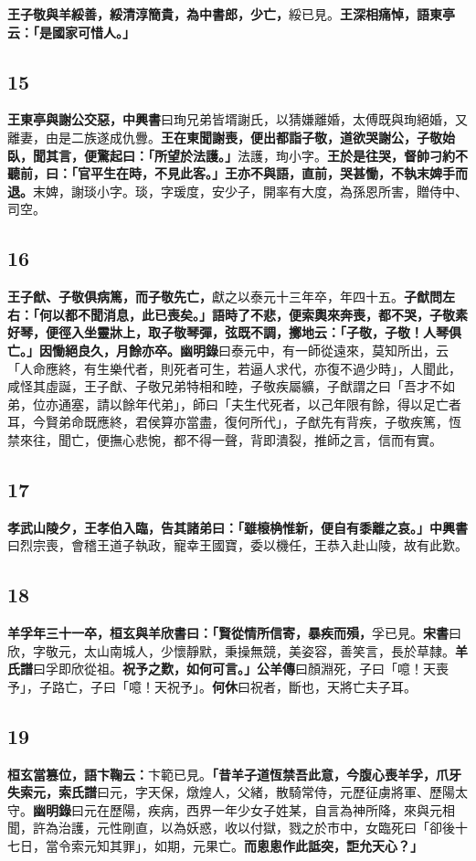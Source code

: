 \textbf{王子敬與羊綏善，綏清淳簡貴，為中書郎，少亡，}{\footnotesize 綏已見。}\textbf{王深相痛悼，語東亭云：「是國家可惜人。」}

\subsection*{15}

\textbf{王東亭與謝公交惡，}{\footnotesize \textbf{中興書}曰珣兄弟皆壻謝氏，以猜嫌離婚，太傅既與珣絕婚，又離妻，由是二族遂成仇釁。}\textbf{王在東聞謝喪，便出都詣子敬，道欲哭謝公，子敬始臥，聞其言，便驚起曰：「所望於法護。」}{\footnotesize 法護，珣小字。}\textbf{王於是往哭，督帥刁約不聽前，曰：「官平生在時，不見此客。」王亦不與語，直前，哭甚慟，不執末婢手而退。}{\footnotesize 末婢，謝琰小字。琰，字瑗度，安少子，開率有大度，為孫恩所害，贈侍中、司空。}

\subsection*{16}

\textbf{王子猷、子敬俱病篤，而子敬先亡，}{\footnotesize 獻之以泰元十三年卒，年四十五。}\textbf{子猷問左右：「何以都不聞消息，此已喪矣。」語時了不悲，便索輿來奔喪，都不哭，子敬素好琴，便徑入坐靈牀上，取子敬琴彈，弦既不調，擲地云：「子敬，子敬！人琴俱亡。」因慟絕良久，月餘亦卒。}{\footnotesize \textbf{幽明錄}曰泰元中，有一師從遠來，莫知所出，云「人命應終，有生樂代者，則死者可生，若逼人求代，亦復不過少時」，人聞此，咸怪其虛誕，王子猷、子敬兄弟特相和睦，子敬疾屬纊，子猷謂之曰「吾才不如弟，位亦通塞，請以餘年代弟」，師曰「夫生代死者，以己年限有餘，得以足亡者耳，今賢弟命既應終，君侯算亦當盡，復何所代」，子猷先有背疾，子敬疾篤，恆禁來往，聞亡，便撫心悲惋，都不得一聲，背即潰裂，推師之言，信而有實。}

\subsection*{17}

\textbf{孝武山陵夕，王孝伯入臨，告其諸弟曰：「雖榱桷惟新，便自有黍離之哀。」}{\footnotesize \textbf{中興書}曰烈宗喪，會稽王道子執政，寵幸王國寶，委以機任，王恭入赴山陵，故有此歎。}

\subsection*{18}

\textbf{羊孚年三十一卒，桓玄與羊欣書曰：「賢從情所信寄，暴疾而殞，}{\footnotesize 孚已見。\textbf{宋書}曰欣，字敬元，太山南城人，少懷靜默，秉操無競，美姿容，善笑言，長於草隸。\textbf{羊氏譜}曰孚即欣從祖。}\textbf{祝予之歎，如何可言。」}{\footnotesize \textbf{公羊傳}曰顏淵死，子曰「噫！天喪予」，子路亡，子曰「噫！天祝予」。\textbf{何休}曰祝者，斷也，天將亡夫子耳。}

\subsection*{19}

\textbf{桓玄當篡位，語卞鞠云：}{\footnotesize 卞範已見。}\textbf{「昔羊子道恆禁吾此意，今腹心喪羊孚，爪牙失索元，}{\footnotesize \textbf{索氏譜}曰元，字天保，燉煌人，父緒，散騎常侍，元歷征虜將軍、歷陽太守。\textbf{幽明錄}曰元在歷陽，疾病，西界一年少女子姓某，自言為神所降，來與元相聞，許為治護，元性剛直，以為妖惑，收以付獄，戮之於市中，女臨死曰「卻後十七日，當令索元知其罪」，如期，元果亡。}\textbf{而悤悤作此詆突，詎允天心？」}